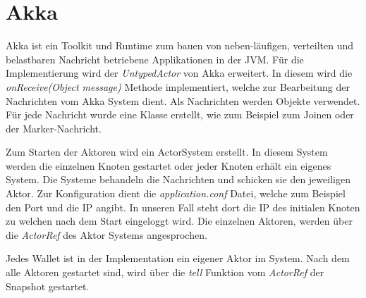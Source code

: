 \section{Akka}
\label{sec:akka}

Akka ist ein Toolkit und Runtime zum bauen von neben-läufigen, verteilten und
belastbaren Nachricht betriebene Applikationen in der JVM. \cite{akka}
Für die Implementierung wird der \textit{UntypedActor} von Akka erweitert.
In diesem wird die \textit{onReceive(Object message)} Methode implementiert, 
welche zur Bearbeitung der Nachrichten vom Akka System dient.
Als Nachrichten werden Objekte verwendet.
Für jede Nachricht wurde eine Klasse erstellt, wie zum Beispiel zum Joinen 
oder der Marker-Nachricht.

Zum Starten der Aktoren wird ein ActorSystem erstellt.
In diesem System werden die einzelnen Knoten gestartet oder jeder Knoten
erhält ein eigenes System.
Die Systeme behandeln die Nachrichten und schicken sie den jeweiligen Aktor.
Zur Konfiguration dient die \textit{application.conf} Datei, welche zum 
Beispiel den Port und die IP angibt.
In unseren Fall steht dort die IP des initialen Knoten zu welchen nach dem 
Start eingeloggt wird.
Die einzelnen Aktoren, werden über die \textit{ActorRef} des Aktor Systems
angesprochen.

Jedes Wallet ist in der Implementation ein eigener Aktor im System.
Nach dem alle Aktoren gestartet sind, wird über die \textit{tell} Funktion 
vom \textit{ActorRef} der Snapshot gestartet.
